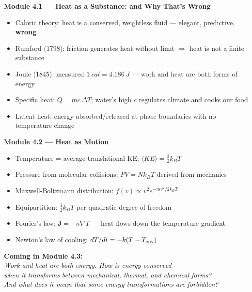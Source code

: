 \documentclass[12pt, a4paper, twoside]{book}
\begin{document}
\begin{tcolorbox}[enhanced,colback=deep!4,colframe=deep,
  title={\bfseries\color{white} Key Ideas: Modules 4.1--4.2},
  attach boxed title to top left={yshift=-2mm,xshift=4mm},
  boxed title style={colback=deep}]
\textbf{Module 4.1 --- Heat as a Substance: and Why That's Wrong}
\begin{itemize}[leftmargin=1.5em,itemsep=2pt]
  \item Caloric theory: heat is a conserved, weightless fluid --- elegant, predictive, \textbf{wrong}
  \item Rumford (1798): friction generates heat without limit $\Rightarrow$ heat is not a finite substance
  \item Joule (1845): measured $\SI{1}{cal} = \SI{4.186}{J}$ --- work and heat are both forms of energy
  \item Specific heat: $Q = mc\,\Delta T$; water's high $c$ regulates climate and cooks our food
  \item Latent heat: energy absorbed/released at phase boundaries with no temperature change
\end{itemize}
\vspace{6pt}
\textbf{Module 4.2 --- Heat as Motion}
\begin{itemize}[leftmargin=1.5em,itemsep=2pt]
  \item Temperature = average translational KE: $\langle KE \rangle = \frac{3}{2}k_BT$
  \item Pressure from molecular collisions: $PV = Nk_BT$ derived from mechanics
  \item Maxwell-Boltzmann distribution: $f(v) \propto v^2 e^{-mv^2/2k_BT}$
  \item Equipartition: $\frac{1}{2}k_BT$ per quadratic degree of freedom
  \item Fourier's law: $\bm{J} = -\kappa\nabla T$ --- heat flows down the temperature gradient
  \item Newton's law of cooling: $dT/dt = -k(T-T_{\rm env})$
\end{itemize}
\end{tcolorbox}

\vspace{0.6cm}
\begin{center}
\end{center}

\vspace{0.5cm}
\begin{center}
{\large\textcolor{deep}{\textbf{Coming in Module 4.3:}}}\\[6pt]
{\itshape\textcolor{midblue}{%
Work and heat are both energy. How is energy conserved\\[3pt]
when it transforms between mechanical, thermal, and chemical forms?\\[3pt]
And what does it mean that some energy transformations are \emph{forbidden}?
}}
\end{center}
\end{document}
